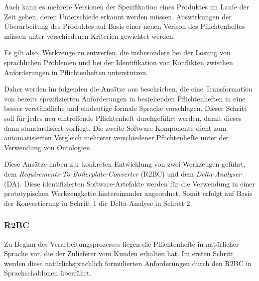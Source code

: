 \documentclass[12pt]{report}
\begin{document}
Auch kann es mehrere Versionen der Spezifikation eines Produktes im Laufe der Zeit geben, deren Unterschiede erkannt werden müssen. Auswirkungen der Überarbeitung des Produktes auf Basis einer neuen Verison des Pflichtenheftes müssen unter verschiedenen Kriterien gewichtet werden. 

Es gilt also, Werkzeuge zu entwerfen, die insbesondere bei der Lösung von sprachlichen Problemen und bei der Identifikation von Konflikten zwischen Anforderungen in Pflichtenheften unterstützen. 

Daher werden im folgenden die Ansätze aus \cite{zh17} beschrieben, die eine Transformation von bereits spezifizierten Anforderungen in bestehenden Pflichtenheften in eine besser verständliche und eindeutige formale Sprache vorschlagen. Dieser Schritt soll für jedes neu eintreffende Pflichtenheft durchgeführt werden, damit dieses dann standardisiert vorliegt. Die zweite Software-Komponente dient zum automatisierten Vergleich mehrerer verschiedener Pflichtenhefte unter der Verwendung von Ontologien. 

Diese Ansätze haben zur konkreten Entwicklung von zwei Werkzeugen geführt, dem \textit{Requirements-To-Boilerplate-Converter} (R2BC) und dem \textit{Delta-Analyser} (DA). Diese identifizierten Software-Artefakte werden für die Verwendung in einer prototypischen Werkzeugkette hintereinander angeordnet. Somit erfolgt auf Basis der Konvertierung in Schritt 1 die Delta-Analyse in Schritt 2.

\subsubsection{R2BC}
Zu Beginn des Verarbeitungsprozesses liegen die Pflichtenhefte in natürlicher Sprache vor, die der Zulieferer vom Kunden erhalten hat. Im ersten Schritt werden diese natürlichsprachlich formulierten Anforderungen durch den R2BC in Sprachschablonen überführt. 
\end{document}
